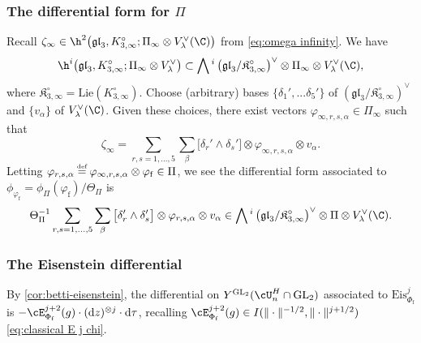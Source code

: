 \documentclass[10pt,reqno,a4paper]{amsart}
\newcommand{\Phif}{{\Phi\subf}}
\newcommand{\subf}{_{\mathrm{f}}}
\newcommand{\GL}{\mathrm{GL}}
\begin{document}
\subsubsection{The differential form for $\Pi$}\label{sec:diff form pi}
Recall $\zeta_\infty \in \h^2\big(\mathfrak{gl}_3,K_{3,\infty}^\circ; \Pi_\infty \otimes V_{\lambda}^{\vee}(\C)\big)$ from \eqref{eq:omega infinity}.
We have
\[
\h^i\big(\mathfrak{gl}_3,K_{3,\infty}^\circ; \Pi_\infty \otimes V_{\lambda}^{\vee}\big) \subset \bigwedge{}^i\left(\mathfrak{gl}_3/\mathfrak{K}_{3,\infty}^\circ\right)^\vee \otimes \Pi_\infty \otimes V_\lambda^\vee(\C),
\]
where $\mathfrak{K}_{3,\infty}^\circ = \mathrm{Lie}(K_{3,\infty}^\circ)$. Choose (arbitrary) bases $\{\delta_1',...\delta_5'\}$ of $\left(\mathfrak{gl}_3/\mathfrak{K}_{3,\infty}^\circ\right)^\vee$ and $\{v_\alpha\}$ of $V_\lambda^\vee(\C)$. Given these choices, there exist vectors $\varphi_{\infty,r,s,\alpha} \in \Pi_\infty$  such that
\[
\zeta_\infty = \sum_{r,s = 1,...,5} \sum_{\beta} \big[\delta_r' \wedge \delta_s'\big] \otimes \varphi_{\infty,r,s,\alpha} \otimes v_\alpha.
\]
Letting $\varphi_{r,s,\alpha} \defeq \varphi_{\infty,r,s,\alpha} \otimes \varphi\subf \in \Pi$, we see the differential form associated to $\phi_{\varphi\subf} = \phi_\Pi(\varphi\subf)/\Theta_\Pi$ is
\begin{equation}\label{eq:diff form pi}
\Theta_\Pi^{-1}\sum_{r,s = 1,...,5} \sum_{\beta} \big[\delta_r' \wedge \delta_s'\big] \otimes \varphi_{r,s,\alpha} \otimes v_\alpha \in \bigwedge{}^i\left(\mathfrak{gl}_3/\mathfrak{K}_{3,\infty}^\circ\right)^\vee \otimes \Pi \otimes V_\lambda^\vee(\C).
\end{equation}

\subsubsection{The Eisenstein differential}
By \cref{cor:betti-eisenstein}, the differential on $Y^{\GL_2}(\cU_{n}^{H}\cap\GL_2)$ associated to $\mathrm{Eis}_{\Phif}^{j}$ is $-\cE_{\Phif}^{j+2}(g) \cdot (\mathrm{d}z)^{\otimes j} \cdot \mathrm{d}\tau$, recalling $\cE_{\Phif}^{j+2}(g) \in I(\|\cdot\|^{-1/2}, \|\cdot\|^{j+1/2})$ \eqref{eq:classical E j chi}.
\end{document}

